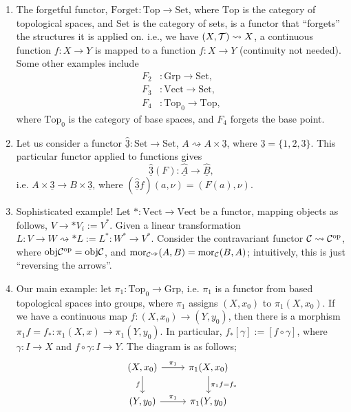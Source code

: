 \begin{enumerate}[label=(\alph*)]
    \item The forgetful functor, $\mathrm{Forget} : \mathrm{Top} \to \mathrm{Set}$, where $\mathrm{Top}$ is the category of topological spaces, and $\mathrm{Set}$ is the category of sets, is a functor that ``forgets'' the structures it is applied on. i.e., we have $(X, \mathcal T) \rightsquigarrow X$, a continuous function $f : X \to Y$ is mapped to a function $f : X \to Y$ (continuity not needed). Some other examples include
    \begin{align*}
        F_2 &: \mathrm{Grp} \to \mathrm{Set}, \\
        F_3 &: \mathrm{Vect} \to \mathrm{Set}, \\
        F_4 &: \mathrm{Top}_0 \to \mathrm{Top},
    \end{align*}
    where $\mathrm{Top}_0$ is the category of base spaces, and $F_4$ forgets the base point.

    \item Let us consider a functor $\hat{\underline{3}} : \mathrm{Set} \to \mathrm{Set}$, $A \rightsquigarrow A \times \underline{3}$, where $\underline{3} = \{1, 2, 3\}$. This particular functor applied to functions gives
    \[ \hat{\underline{3}}(F) : \hat{\underline{A}} \to \hat{\underline{B}}, \]
    i.e. $A \times \underline{3} \to B \times \underline{3}$, where $(\hat{\underline{3}} f) (a, \nu) = (F(a), \nu)$.
    
    \item Sophisticated example! Let $\ast : \mathrm{Vect} \to \mathrm{Vect}$ be a functor, mapping objects as follows, $V \to \ast V_i := V^\ast$. Given a linear transformation $L : V \to W \rightsquigarrow \ast L := L^\ast : W^\ast \to V^\ast$. Consider the contravariant functor $\mathcal C \rightsquigarrow \mathcal C^{\mathrm{op}}$, where $\mathrm{obj} \mathcal C^{\mathrm{op}} = \mathrm{obj} \mathcal C$, and $\mathrm{mor}_{\mathcal C^{\mathrm{op}}} (A, B) = \mathrm{mor}_{\mathcal C}(B, A)$; intuitively, this is just ``reversing the arrows''.
    
    \item Our main example: let $\pi_1 : \mathrm{Top}_0 \to \mathrm{Grp}$, i.e. $\pi_1$ is a functor from based topological spaces into groups, where $\pi_1$ assigns $(X, x_0)$ to $\pi_1(X, x_0)$. If we have a continuous map $f : (X, x_0) \to (Y, y_0)$, then there is a morphism $\pi_1 f = f_\ast : \pi_1(X, x) \to \pi_1(Y, y_0)$. In particular, $f_\ast [\gamma] := [f \circ \gamma]$, where $\gamma : I \to X$ and $f \circ \gamma : I \to Y$. The diagram is as follows;
    \[
        \begin{tikzcd}
            (X, x_0) \arrow[r, "\pi_1"] \arrow[d, "f"'] & \pi_1(X, x_0) \arrow[d, "\pi_1 f = f_\ast"] \\
            (Y, y_0) \arrow[r, "\pi_1"] & \pi_1(Y, y_0)
        \end{tikzcd}
    \]
\end{enumerate}

